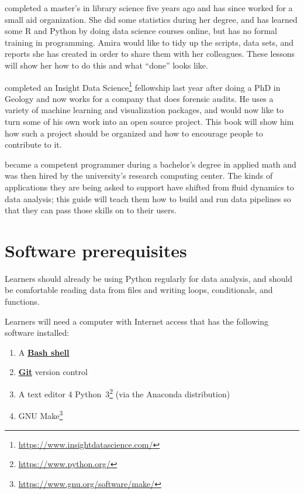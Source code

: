 \documentclass[
]{krantz}
\providecommand{\tightlist}{%
  \setlength{\itemsep}{0pt}\setlength{\parskip}{0pt}}
\renewcommand{\href}[2]{#2\footnote{\url{#1}}}
\newcommand{\gref}[2]{\hyperlink{#2}{\textbf{#1}}}
\begin{document}
\begin{description}
\tightlist
\item[Amira Khan]
completed a master's in library science five years ago
and has since worked for a small aid organization.
She did some statistics during her degree,
and has learned some R and Python by doing data science courses online,
but has no formal training in programming.
Amira would like to tidy up the scripts, data sets, and reports she has created
in order to share them with her colleagues.
These lessons will show her how to do this and what ``done'' looks like.
\item[Jun Hsu]
completed an \href{https://www.insightdatascience.com/}{Insight Data Science} fellowship last year after doing a PhD in Geology
and now works for a company that does forensic audits.
He uses a variety of machine learning and visualization packages,
and would now like to turn some of his own work into an open source project.
This book will show him how such a project should be organized
and how to encourage people to contribute to it.
\item[Sami Virtanen]
became a competent programmer during a bachelor's degree in applied math
and was then hired by the university's research computing center.
The kinds of applications they are being asked to support
have shifted from fluid dynamics to data analysis;
this guide will teach them how to build and run data pipelines
so that they can pass those skills on to their users.
\end{description}

\hypertarget{install-software}{%
\section{Software prerequisites}\label{install-software}}

Learners should already be using Python regularly for data analysis,
and should be comfortable reading data from files
and writing loops, conditionals, and functions.

Learners will need a computer with Internet access
that has the following software installed:

\begin{enumerate}
\def\labelenumi{\arabic{enumi}.}
\tightlist
\item
  A \gref{Bash shell}{shell}
\item
  \gref{Git}{git} version control
\item
  A text editor
  4 \href{https://www.python.org/}{Python~3} (via the Anaconda distribution)
\item
  \href{https://www.gnu.org/software/make/}{GNU Make}
\end{enumerate}
\end{document}
